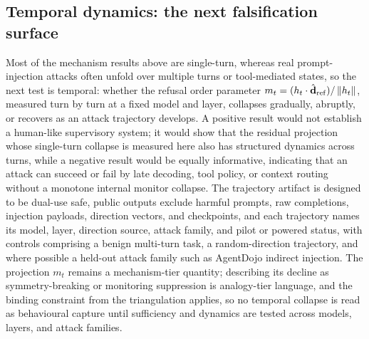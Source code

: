 \subsection{Temporal dynamics: the next falsification surface}
Most of the mechanism results above are single-turn, whereas real prompt-injection
attacks often unfold over multiple turns or tool-mediated states, so the next test is
temporal: whether the refusal order parameter $m_t = (h_t \cdot \hat{\mathbf{d}}_{\mathrm{ref}})/\left\|h_t\right\|$,
measured turn by turn at a fixed model and layer, collapses gradually, abruptly, or
recovers as an attack trajectory develops. A positive result would not establish a
human-like supervisory system; it would show that the residual projection whose
single-turn collapse is measured here also has structured dynamics across turns, while
a negative result would be equally informative, indicating that an attack can succeed
or fail by late decoding, tool policy, or context routing without a monotone internal
monitor collapse. The trajectory artifact is designed to be dual-use safe, public
outputs exclude harmful prompts, raw completions, injection payloads, direction
vectors, and checkpoints, and each trajectory names its model, layer, direction
source, attack family, and pilot or powered status, with controls comprising a benign
multi-turn task, a random-direction trajectory, and where possible a held-out attack
family such as AgentDojo indirect injection. The projection $m_t$ remains a
mechanism-tier quantity; describing its decline as symmetry-breaking or monitoring
suppression is analogy-tier language, and the binding constraint from the triangulation
applies, so no temporal collapse is read as behavioural capture until sufficiency and
dynamics are tested across models, layers, and attack families.
